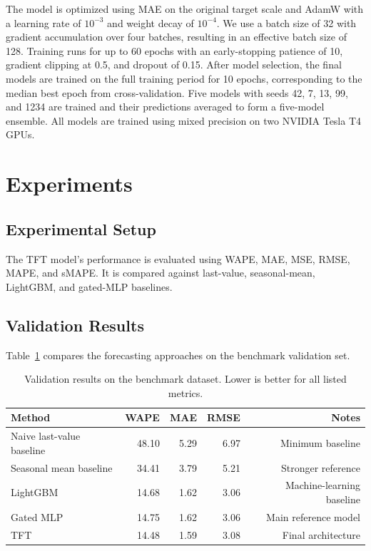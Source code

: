 \documentclass[11pt]{article}
\begin{document}
\noindent
The model is optimized using MAE on the original target scale and AdamW with a learning rate of $10^{-3}$ and weight decay of $10^{-4}$. We use a batch size of 32 with gradient accumulation over four batches, resulting in an effective batch size of 128. Training runs for up to 60 epochs with an early-stopping patience of 10, gradient clipping at 0.5, and dropout of 0.15. After model selection, the final models are trained on the full training period for 10 epochs, corresponding to the median best epoch from cross-validation. Five models with seeds 42, 7, 13, 99, and 1234 are trained and their predictions averaged to form a five-model ensemble. All models are trained using mixed precision on two NVIDIA Tesla T4 GPUs.


\section{Experiments}



\subsection{Experimental Setup}
The TFT model's performance is evaluated using WAPE, MAE, MSE, RMSE, MAPE, and sMAPE. It is compared against last-value, seasonal-mean, LightGBM, and gated-MLP baselines.


\subsection{Validation Results}

Table~\ref{tab:benchmark-results} compares the forecasting approaches on the
benchmark validation set.

\begin{table}[h]
\centering
\begin{tabular}{lrrrr}
\toprule
Method & WAPE & MAE & RMSE & Notes \\
\midrule
Naive last-value baseline & 48.10 & 5.29 & 6.97 & Minimum baseline \\
Seasonal mean baseline & 34.41 & 3.79 & 5.21 & Stronger reference \\
LightGBM & 14.68 & 1.62 & 3.06 & Machine-learning baseline \\
Gated MLP & 14.75 & 1.62 & 3.06 & Main reference model \\
TFT & 14.48 & 1.59 & 3.08 & Final architecture \\
\bottomrule
\end{tabular}
\caption{Validation results on the benchmark dataset. Lower is better for all listed metrics.}
\label{tab:benchmark-results}
\end{table}
\end{document}
